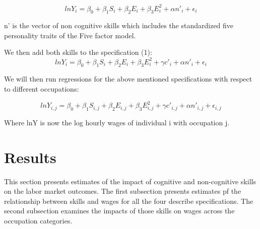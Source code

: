 \documentclass[11pt, a4paper, leqno]{article}
\begin{document}
  \[lnY_{i} = \beta_{0} + \beta_{1}S_{i} + \beta_{2}E_{i} + \beta_{3}E_{i}^{2} + \alpha n'_{i} \label{eq:noncog}+\epsilon_{i} \tag{3} \]  
  
  n' is the vector of non cognitive skills which includes the standardized  five personality traits of the Five factor model. 
  
  We then add both skills to the specification (1): 
  \[lnY_{i} = \beta_{0} + \beta_{1}S_{i} + \beta_{2}E_{i} + \beta_{3}E_{i}^{2} + \gamma c'_{i} + \alpha n'_{i} +\epsilon_{i}  \label{eq:cog} \tag{4} \]
  
  We will then run regressions for the above mentioned specifications with respect to different occupations:
    
 \[lnY_{i,j} = \beta_{0} + \beta_{1}S_{i,j} + \beta_{2}E_{i,j} + \beta_{3}E_{i,j}^{2} + \gamma c'_{i,j} + \alpha n'_{i,j} +\epsilon_{i,j}  \label{eq:cog} \tag{5} \]
 
 Where lnY is now the log hourly wages of individual i with occupation j. 
 
 \section*{Results}
 This section presents estimates of the impact of cognitive and non-cognitive skills on the labor market outcomes. The first subsection presents estimates pf the relationship between skills and wages for  all the four describe specifications. The second subsection examines the impacts of those skills on wages across the occupation categories. 
\end{document}
